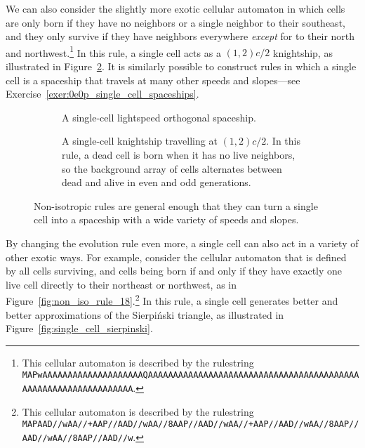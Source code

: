 We can also consider the slightly more exotic cellular automaton in which cells are only born if they have no neighbors or a single neighbor to their southeast, and they only survive if they have neighbors everywhere \emph{except} for to their north and northwest.\footnote{This cellular automaton is described by the rulestring\protect\\\texttt{MAPwAAAAAAAAAAAAAAAAAAAAQAAAAAAAAAAAAAAAAAAAAAAAAAAAAAAAAAAAAAAAAAAAAAAAAAAAAAAAAAAAAAAAA}.} In this rule, a single cell acts as a $(1,2)c/2$ knightship, as illustrated in Figure~\ref{fig:single_cell_knightship}. It is similarly possible to construct rules in which a single cell is a spaceship that travels at many other speeds and slopes---see Exercise~\ref{exer:0e0p_single_cell_spaceships}.

\begin{figure}[!htb]
	\centering
	\begin{subfigure}{.32\textwidth}
		\centering
		\caption{A single-cell lightspeed orthogonal spaceship.}
		\label{fig:single_cell_orth}
		\begin{minipage}{.1cm}
			\vfill
		\end{minipage}
	\end{subfigure} \hfill %
	\begin{subfigure}{.65\textwidth}
		\centering
		\caption{A single-cell knightship travelling at $(1,2)c/2$. In this rule, a dead cell is born when it has no live neighbors, so the background array of cells alternates between dead and alive in even and odd generations.}
		\label{fig:single_cell_knightship}
	\end{subfigure}
	\caption{Non-isotropic rules are general enough that they can turn a single cell into a spaceship with a wide variety of speeds and slopes.}\label{fig:single_cell_spaceships}
\end{figure}

By changing the evolution rule even more, a single cell can also act in a variety of other exotic ways. For example, consider the cellular automaton that is defined by all cells surviving, and cells being born if and only if they have exactly one live cell directly to their northeast or northwest, as in Figure~\ref{fig:non_iso_rule_18}.\footnote{This cellular automaton is described by the rulestring\protect\\\texttt{MAPAAD//wAA//+AAP//AAD//wAA//8AAP//AAD//wAA//+AAP//AAD//wAA//8AAP//AAD//wAA//8AAP//AAD//w}.} In this rule, a single cell generates better and better approximations of the Sierpi\'{n}ski triangle, as illustrated in Figure~\ref{fig:single_cell_sierpinski}. 


